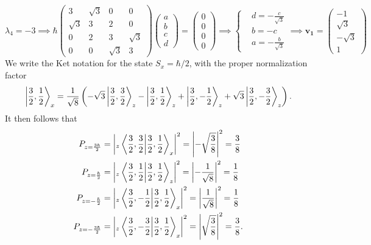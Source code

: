 \documentclass[12pt]{article}
\theoremstyle{definition}
\theoremstyle{definition}
\theoremstyle{definition}
\theoremstyle{definition}
\theoremstyle{definition}
\theoremstyle{example}
\theoremstyle{note}
\theoremstyle{remark}
\theoremstyle{example}
\begin{document}
			\begin{equation*}
			\lambda_{4} =-3 \implies \hbar\begin{pmatrix}
			3 & \sqrt{3} & 0 & 0 \\
			\sqrt{3} & 3 & 2 & 0\\
			0 & 2 & 3 & \sqrt{3} \\
			0 & 0 & \sqrt{3} & 3
			\end{pmatrix}\begin{pmatrix}
			a \\ b \\ c \\ d
			\end{pmatrix} = \begin{pmatrix}
			0 \\ 0 \\0  \\0 
			\end{pmatrix} \implies \begin{cases}
			&d = -\frac{c}{\sqrt{3}}  \\
			&b = -c\\
			&a = -\frac{b}{\sqrt{3}}
			\end{cases} \implies \boldsymbol{v_{1}} = \begin{pmatrix}
			-1 \\ \sqrt{3} \\ -\sqrt{3} \\ 1
			\end{pmatrix}
			\end{equation*} 
			We write the Ket notation for the state $S_{x} = \hbar / 2$, with the proper normalization factor
			$$ \ket{\frac32 , \frac12}_{x} = \frac{1}{\sqrt{8}} \left(-\sqrt{3} \ket{\frac32 ,\frac32}_{z} - \ket{\frac32 , \frac12}_{z} + \ket{\frac32 , -\frac12}_{z} +\sqrt{3}\ket{\frac32 , -\frac32}_{z}\right).$$
			It then follows that
			\begin{align*}
				 P_{z = \frac{3\hbar}{2}} &= \abs{_{z}\braket{\frac32 , \frac32}{\frac32 , \frac12}_{x}}^{2} = \abs{-\sqrt{\frac38}}^{2} = \frac38 \\
				 P_{z = \frac{\hbar}{2}} &= \abs{_{z}\braket{\frac32, \frac12}{ \frac32, \frac12}_{z}}^{2} = \abs{-\frac{1}{\sqrt{8}}}^{2} = \frac18 \\
				 P_{z = -\frac{\hbar}{2}} &= \abs{_{z}\braket{\frac32 , -\frac12}{\frac32 , \frac12}_{x}}^{2} = \abs{\frac{1}{\sqrt{8}}}^{2} = \frac18\\
				 P_{z = -\frac{3\hbar}{2}} &= \abs{_{z}\braket{\frac32 , -\frac32}{\frac32, \frac12}_{x}}^{2} = \abs{\sqrt{\frac{3}{8}}}^{2} = \frac38.
			\end{align*}
	
\end{document}
